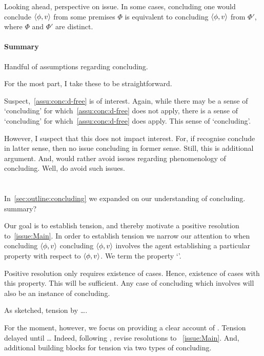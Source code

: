 \begin{note}
  Looking ahead, perspective on issue.
  In some cases, concluding one would conclude \(\langle \phi, v \rangle\) from some premises \(\Phi\) is equivalent to concluding \(\langle \phi, v \rangle\) from \(\Phi'\), where \(\Phi\) and \(\Phi'\) are distinct.
\end{note}

\paragraph{Summary}

\begin{note}[Summary]
  Handful of assumptions regarding concluding.

  For the most part, I take these to be straightforward.

  Suspect,~\autoref{assu:conc:d-free} is of interest.
  Again, while there may be a sense of `concluding' for which~\autoref{assu:conc:d-free} does not apply, there is a sense of `concluding' for which~\autoref{assu:conc:d-free} does apply.
  This sense of `concluding'.

  However, I suspect that this does not impact interest.
  For, if recognise conclude in latter sense, then no issue concluding in former sense.
  Still, this is additional argument.
  And, would rather avoid issues regarding phenomenology of concluding.
  Well, do avoid such issues.
\end{note}

\section{}
\label{sec:overview:csn2}

\begin{note}
  \begin{quote}
    \issueMain*
  \end{quote}
  In~\autoref{sec:outline:concluding} we expanded on our understanding of concluding.
  {
    \color{red} summary?
  }

  Our goal is to establish tension, and thereby motivate a positive resolution to~\autoref{issue:Main}.
  In order to establish tension we narrow our attention to when concluding \(\langle \phi, v \rangle\) concluding \(\langle \phi, v \rangle\) involves the agent establishing a particular property with respect to \(\langle \phi, v \rangle\).
  We term the property `\zs{}'.

  Positive resolution only requires existence of cases.
  Hence, existence of cases with this property.
  This will be sufficient.
  Any case of concluding which involves \csVImp{} will also be an instance of concluding.

  As sketched, tension by {\color{red} \dots}.

  For the moment, however, we focus on providing a clear account of \csN{}.
  Tension delayed until \dots
  Indeed, following \csN{}, revise resolutions to ~\autoref{issue:Main}.
  And, additional building blocks for tension via two types of concluding.
\end{note}

